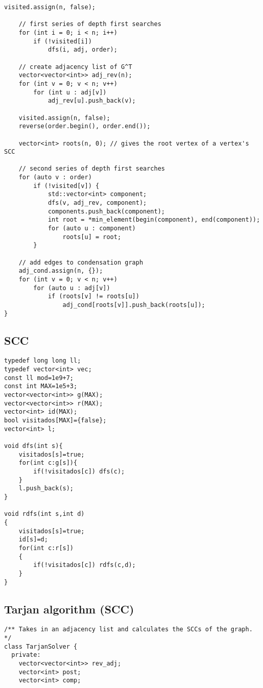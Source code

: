\documentclass[10pt]{article}
\begin{document}
\begin{multicols*}{2}
\begin{lstlisting}[style=compactcpp]
    visited.assign(n, false);

    // first series of depth first searches
    for (int i = 0; i < n; i++)
        if (!visited[i])
            dfs(i, adj, order);

    // create adjacency list of G^T
    vector<vector<int>> adj_rev(n);
    for (int v = 0; v < n; v++)
        for (int u : adj[v])
            adj_rev[u].push_back(v);

    visited.assign(n, false);
    reverse(order.begin(), order.end());

    vector<int> roots(n, 0); // gives the root vertex of a vertex's SCC

    // second series of depth first searches
    for (auto v : order)
        if (!visited[v]) {
            std::vector<int> component;
            dfs(v, adj_rev, component);
            components.push_back(component);
            int root = *min_element(begin(component), end(component));
            for (auto u : component)
                roots[u] = root;
        }

    // add edges to condensation graph
    adj_cond.assign(n, {});
    for (int v = 0; v < n; v++)
        for (auto u : adj[v])
            if (roots[v] != roots[u])
                adj_cond[roots[v]].push_back(roots[u]);
}
\end{lstlisting}

\subsection{SCC}

\begin{lstlisting}[style=compactcpp]
typedef long long ll;
typedef vector<int> vec;
const ll mod=1e9+7;
const int MAX=1e5+3;
vector<vector<int>> g(MAX);
vector<vector<int>> r(MAX);
vector<int> id(MAX);
bool visitados[MAX]={false};
vector<int> l;

void dfs(int s){
    visitados[s]=true;
    for(int c:g[s]){
        if(!visitados[c]) dfs(c);
    }
    l.push_back(s);
}

void rdfs(int s,int d)
{
    visitados[s]=true;
    id[s]=d;
    for(int c:r[s])
    {
        if(!visitados[c]) rdfs(c,d);
    }
}
\end{lstlisting}

\subsection{Tarjan algorithm (SCC)}

\begin{lstlisting}[style=compactcpp]
/** Takes in an adjacency list and calculates the SCCs of the graph. */
class TarjanSolver {
  private:
	vector<vector<int>> rev_adj;
	vector<int> post;
	vector<int> comp;


\end{lstlisting}
\end{multicols*}
\end{document}
